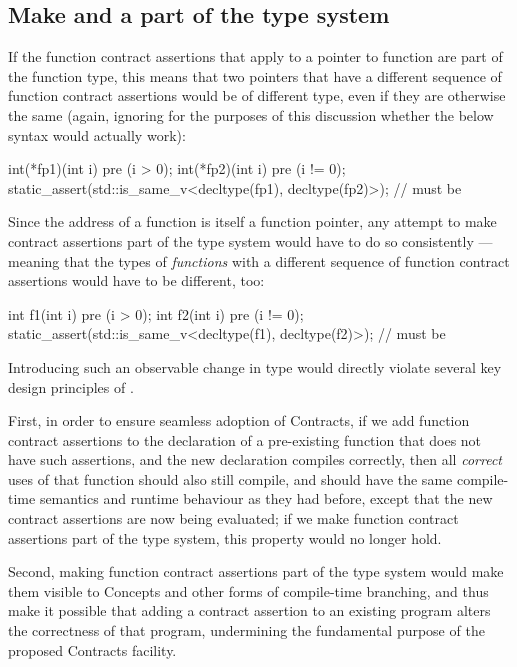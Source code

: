 \subsection{Make  and  a part of the type system}
\label{subsec:maketype}

If the function contract assertions that apply to a pointer to function are part of the function type, this means that two pointers that have a different sequence of function contract assertions would be of different type, even if they are otherwise the same (again, ignoring for the purposes of this discussion whether the below syntax would actually work):
\begin{codeblock}
int(*fp1)(int i) pre (i > 0);
int(*fp2)(int i) pre (i != 0);
static_assert(std::is_same_v<decltype(fp1), decltype(fp2)>);  // must be 
\end{codeblock}
Since the address of a function is itself a function pointer, any attempt to make contract assertions part of the type system would have to do so consistently --- meaning that the types of \emph{functions} with a different sequence of function contract assertions would have to be different, too:
\begin{codeblock}
int f1(int i) pre (i > 0);
int f2(int i) pre (i != 0);
static_assert(std::is_same_v<decltype(f1), decltype(f2)>);  // must be 
\end{codeblock}
Introducing such an observable change in type would directly violate several key design principles of \cite{P2900R7}.

First, in order to ensure seamless adoption of Contracts, if we add function contract assertions to the declaration of a pre-existing function that does not have such assertions, and the new declaration compiles correctly, then all \emph{correct} uses of that function should also still compile, and should have the same compile-time semantics and runtime behaviour as they had before, except that the new contract assertions are now being evaluated; if we make function contract assertions part of the type system, this property would no longer hold.

Second, making function contract assertions part of the type system would make them visible to Concepts and other forms of compile-time branching, and thus make it possible that adding a contract assertion to an existing program alters the correctness of that program, undermining the fundamental purpose of the proposed Contracts facility.

